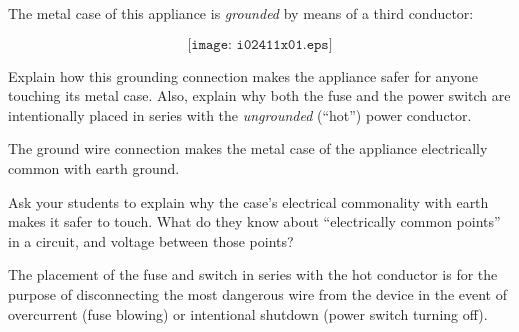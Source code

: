 

The metal case of this appliance is {\it grounded} by means of a third conductor:

$$\texttt{[image: i02411x01.eps]}$$

Explain how this grounding connection makes the appliance safer for anyone touching its metal case.  Also, explain why both the fuse and the power switch are intentionally placed in series with the {\it ungrounded} (``hot'') power conductor.







The ground wire connection makes the metal case of the appliance electrically common with earth ground.







Ask your students to explain why the case's electrical commonality with earth makes it safer to touch.  What do they know about ``electrically common points'' in a circuit, and voltage between those points?

\vskip 10pt

The placement of the fuse and switch in series with the hot conductor is for the purpose of disconnecting the most dangerous wire from the device in the event of overcurrent (fuse blowing) or intentional shutdown (power switch turning off).




